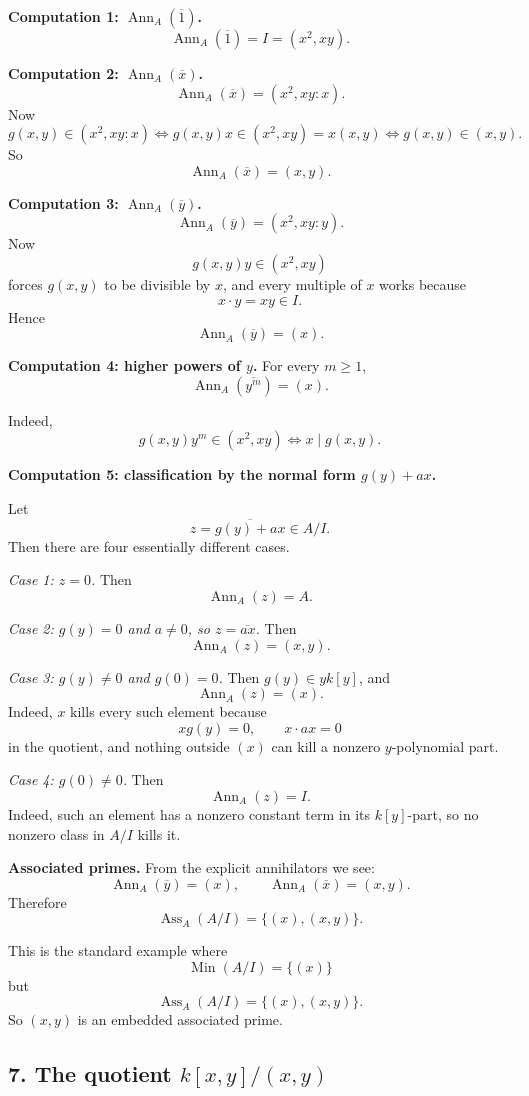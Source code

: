 \documentclass[12pt,a4paper]{article}
\theoremstyle{notespace}
\DeclareMathOperator{\Ass}{Ass}
\DeclareMathOperator{\Ann}{Ann}
\DeclareMathOperator{\Min}{Min}
\begin{document}
\textbf{Computation 1: \(\Ann_A(\overline 1)\).}
\[
\Ann_A(\overline 1)=I=(x^2,xy).
\]

\textbf{Computation 2: \(\Ann_A(\overline x)\).}
\[
\Ann_A(\overline x)=(x^2,xy:x).
\]
Now
\[
g(x,y)\in (x^2,xy:x)
\iff g(x,y)x\in (x^2,xy)=x(x,y)
\iff g(x,y)\in (x,y).
\]
So
\[
\Ann_A(\overline x)=(x,y).
\]

\textbf{Computation 3: \(\Ann_A(\overline y)\).}
\[
\Ann_A(\overline y)=(x^2,xy:y).
\]
Now
\[
g(x,y)y\in (x^2,xy)
\]
forces \(g(x,y)\) to be divisible by \(x\), and every multiple of \(x\) works because
\[
x\cdot y=xy\in I.
\]
Hence
\[
\Ann_A(\overline y)=(x).
\]

\textbf{Computation 4: higher powers of \(y\).}
For every \(m\ge 1\),
\[
\Ann_A(\overline{y^m})=(x).
\]

Indeed,
\[
g(x,y)y^m\in (x^2,xy)
\iff x\mid g(x,y).
\]

\textbf{Computation 5: classification by the normal form \(g(y)+ax\).}

Let
\[
z=\overline{g(y)+ax}\in A/I.
\]
Then there are four essentially different cases.

\medskip

\emph{Case 1: \(z=0\).}
Then
\[
\Ann_A(z)=A.
\]

\medskip

\emph{Case 2: \(g(y)=0\) and \(a\neq 0\), so \(z=\overline{ax}\).}
Then
\[
\Ann_A(z)=(x,y).
\]

\medskip

\emph{Case 3: \(g(y)\neq 0\) and \(g(0)=0\).}
Then \(g(y)\in yk[y]\), and
\[
\Ann_A(z)=(x).
\]
Indeed, \(x\) kills every such element because
\[
xg(y)=0,\qquad x\cdot ax=0
\]
in the quotient, and nothing outside \((x)\) can kill a nonzero \(y\)-polynomial part.

\medskip

\emph{Case 4: \(g(0)\neq 0\).}
Then
\[
\Ann_A(z)=I.
\]
Indeed, such an element has a nonzero constant term in its \(k[y]\)-part, so no nonzero class in \(A/I\) kills it.

\medskip

\textbf{Associated primes.}
From the explicit annihilators we see:
\[
\Ann_A(\overline y)=(x),
\qquad
\Ann_A(\overline x)=(x,y).
\]
Therefore
\[
\Ass_A(A/I)=\{(x),(x,y)\}.
\]

This is the standard example where
\[
\Min(A/I)=\{(x)\}
\]
but
\[
\Ass_A(A/I)=\{(x),(x,y)\}.
\]
So \((x,y)\) is an embedded associated prime.

\subsection{7. The quotient \(k[x,y]/(x,y)\)}
\end{document}
